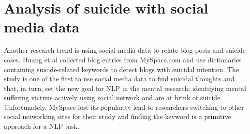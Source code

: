\section{Analysis of suicide with social media data}

Another research trend is using social media data to relate blog posts and suicide cases. Huang et al \cite{Huang2008} collected blog entries from MySpace.com and use dictionaries containing suicide-related keywords to detect blogs with suicidal intention. The study is one of the first to use social media data to find suicidal thoughts and that, in turn, set the new goal for NLP in the mental research: identifying mental suffering victims actively using social network and are at brink of suicide. Unfortunately, MySpace lost its popularity lead to researchers switching to other social networking sites for their study and finding the keyword is a primitive approach for a NLP task.\\

